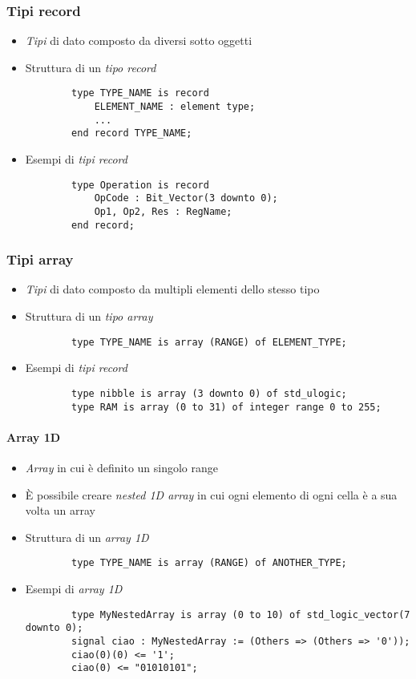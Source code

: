 \documentclass{article}
\begin{document}
\subsubsection{Tipi record}
\begin{itemize}
  \item \textit{Tipi} di dato composto da diversi sotto oggetti
  \item Struttura di un \textit{tipo record}
        \begin{verbatim}
	    type TYPE_NAME is record
		    ELEMENT_NAME : element type;
		    ...
	    end record TYPE_NAME;
	      \end{verbatim}
  \item Esempi di \textit{tipi record}
        \begin{verbatim}
	    type Operation is record
		    OpCode : Bit_Vector(3 downto 0);
		    Op1, Op2, Res : RegName;
	    end record;
	      \end{verbatim}
\end{itemize}

\subsubsection{Tipi array}
\begin{itemize}
  \item \textit{Tipi} di dato composto da multipli elementi dello stesso tipo
  \item Struttura di un \textit{tipo array}
        \begin{verbatim}
	    type TYPE_NAME is array (RANGE) of ELEMENT_TYPE;
	      \end{verbatim}
  \item Esempi di \textit{tipi record}
        \begin{verbatim}
	    type nibble is array (3 downto 0) of std_ulogic;
	    type RAM is array (0 to 31) of integer range 0 to 255;
	      \end{verbatim}
\end{itemize}

\paragraph{Array 1D}
\begin{itemize}
  \item \textit{Array} in cui è definito un singolo range
  \item \`E possibile creare \textit{nested 1D array} in cui ogni elemento di ogni cella è a sua volta un array
  \item Struttura di un \textit{array 1D}
        \begin{verbatim}
	    type TYPE_NAME is array (RANGE) of ANOTHER_TYPE;
	\end{verbatim}
  \item Esempi di \textit{array 1D}
        \begin{verbatim}
	    type MyNestedArray is array (0 to 10) of std_logic_vector(7 downto 0);
	    signal ciao : MyNestedArray := (Others => (Others => '0'));
	    ciao(0)(0) <= '1';
	    ciao(0) <= "01010101";
	\end{verbatim}
\end{itemize}
\end{document}
